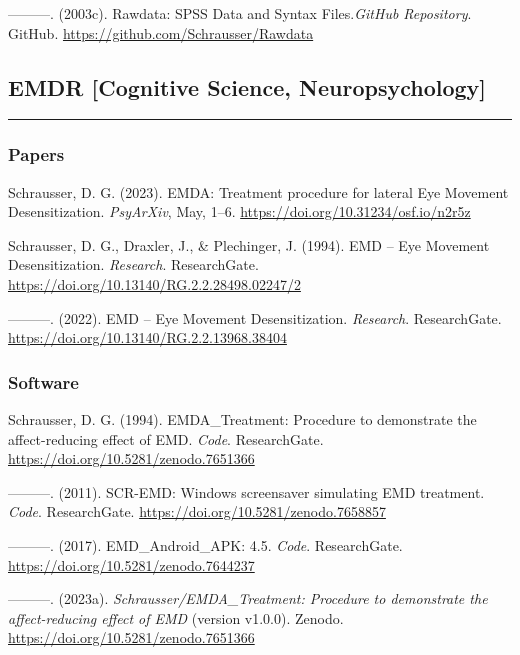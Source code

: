 \documentclass[
]{article}
\begin{document}
---------. (2003c). Rawdata: SPSS Data and Syntax Files.\emph{GitHub
Repository}. GitHub. \url{https://github.com/Schrausser/Rawdata}

\hypertarget{emdr-cognitive-science-neuropsychology}{%
\subsection{EMDR {[}Cognitive Science,
Neuropsychology{]}}\label{emdr-cognitive-science-neuropsychology}}

\begin{center}\rule{0.5\linewidth}{0.5pt}\end{center}

\hypertarget{papers}{%
\subsubsection{Papers}\label{papers}}

Schrausser, D. G. (2023). EMDA: Treatment procedure for lateral Eye
Movement Desensitization. \emph{PsyArXiv}, May, 1--6.
\url{https://doi.org/10.31234/osf.io/n2r5z}

Schrausser, D. G., Draxler, J., \& Plechinger, J. (1994). EMD -- Eye
Movement Desensitization. \emph{Research}. ResearchGate.
\url{https://doi.org/10.13140/RG.2.2.28498.02247/2}

---------. (2022). EMD -- Eye Movement Desensitization. \emph{Research}.
ResearchGate. \url{https://doi.org/10.13140/RG.2.2.13968.38404}

\hypertarget{software}{%
\subsubsection{Software}\label{software}}

Schrausser, D. G. (1994). EMDA\_Treatment: Procedure to demonstrate the
affect-reducing effect of EMD. \emph{Code}. ResearchGate.
\url{https://doi.org/10.5281/zenodo.7651366}

---------. (2011). SCR-EMD: Windows screensaver simulating EMD
treatment. \emph{Code}. ResearchGate.
\url{https://doi.org/10.5281/zenodo.7658857}

---------. (2017). EMD\_Android\_APK: 4.5. \emph{Code}. ResearchGate.
\url{https://doi.org/10.5281/zenodo.7644237}

---------. (2023a). \emph{Schrausser/EMDA\_Treatment: Procedure to
demonstrate the affect-reducing effect of EMD} (version v1.0.0). Zenodo.
\url{https://doi.org/10.5281/zenodo.7651366}
\end{document}
